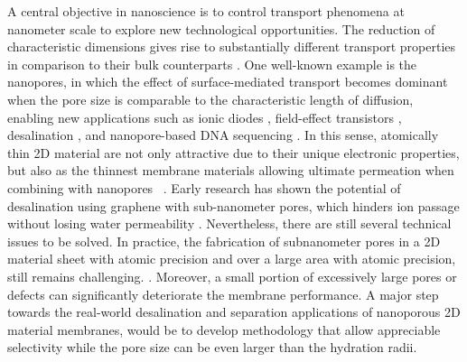 %
A central objective in nano\-science is to control
transport phenomena at nanometer scale to explore new technological
opportunities.  The reduction of characteristic dimensions gives rise to substantially different transport
properties in comparison to their bulk counterparts
\cite{Schoch_2008_nanofluid}.
%
One well-known example is the nanopores, in which the effect of
surface-mediated transport becomes dominant when the pore size is
comparable to the characteristic length of diffusion, enabling new
applications such as ionic diodes
\cite{Karnik_2007_nanofluidic,Siwy_2002_fabrication_NPore,Vlassiouk_2007_nanofluidic},
field-effect transistors \cite{Nam_2009_IFET_sub10nm}, desalination
\cite{Heiranian_2015_desali}, and nanopore-based DNA sequencing
\cite{Heerema_2016_gr_np_DNA,Garaj_2013_hugging_gr_pore}.
%
In this sense, atomically thin 2D material are not only attractive due
to their unique electronic properties, but also as the thinnest
membrane materials allowing ultimate permeation when combining with
nanopores
~\cite{Suk_2010_water_PG,Jiang_2009_PG_gas,Celebi_2014_science,Koenig_2012,Drahushuk_2012_gas_permeation_gr}.
%
Early research has shown the potential of desalination using graphene
with sub-nanometer pores, which hinders ion passage without losing
water permeability
\cite{Cohen_Tanugi_2012,Suk_2014_ion_sub_5nm,Cohen_Tanugi_2014_permeab,Cohen_Tanugi_2015_PG,O_Hern_2014_ion,O_Hern_2015_ion_gr,Surwade_2015_desali_npg,Walker_2017_cation_select_2D,Ghosh_2018_PG_ion}.
Nevertheless, there are still several technical issues to be solved.
In practice, the fabrication of sub\-nanometer pores in
a 2D material sheet with atomic precision and over a large area with
atomic precision, still remains challenging.
\cite{Suk_2014_ion_sub_5nm,Rollings_2016_gating,O_Hern_2012_defect,Wang_2017_mechanism_thin_membrane}.
%
Moreover, a small portion of excessively large pores or defects can
significantly deteriorate the membrane performance.
%
A major step towards the real-world desalination and separation
applications of nanoporous 2D material membranes, would be to develop
methodology that allow appreciable selectivity while the pore size can
be even larger than the hydration radii.

